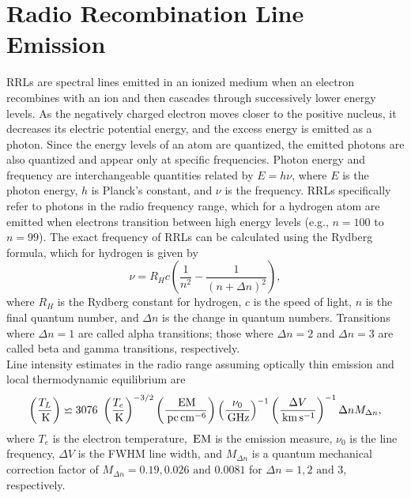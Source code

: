 \section{Radio Recombination Line Emission}
\label{sec:rrl_emission}

RRLs are spectral lines emitted in an ionized medium when an electron recombines with an ion and then cascades through successively lower energy levels. As the negatively charged electron moves closer to the positive nucleus, it decreases its electric potential energy, and the excess energy is emitted as a photon. Since the energy levels of an atom are quantized, the emitted photons are also quantized and appear only at specific frequencies. Photon energy and frequency are interchangeable quantities related by \(E = h\nu\), where \(E\) is the photon energy, \(h\) is Planck's constant, and \(\nu\) is the frequency. RRLs specifically refer to photons in the radio frequency range, which for a hydrogen atom are emitted when electrons transition between high energy levels (e.g., \(n=100\) to \(n=99\)). The exact frequency of RRLs can be calculated using the Rydberg formula, which for hydrogen is given by
\begin{equation}
    \nu = R_H c \left( \frac{1}{n^2} - \frac{1}{(n + \Delta n)^2} \right),
    \label{eq:rydberg_formula}
\end{equation}
where \(R_H\) is the Rydberg constant for hydrogen, \(c\) is the speed of light, \(n\) is the final quantum number, and \(\Delta n\) is the change in quantum numbers. Transitions where \(\Delta n = 1\) are called alpha transitions; those where \(\Delta n = 2\) and \(\Delta n = 3\) are called beta and gamma transitions, respectively.\\

Line intensity estimates in the radio range assuming optically thin emission and local thermodynamic equilibrium are \cite{andersonGBTDiffuseIonized2021}
\begin{equation}
    \left( \frac{T_L}{\, \mathrm{K}} \right) \backsimeq 3076~\left(\frac{T_e}{\, \mathrm{K}}\right)^{-3/2}\left(\frac{\, \mathrm{EM}}{\, \mathrm{pc} \, \mathrm{cm}^{-6}}\right) \left(\frac{\nu_0}{\, \mathrm{GHz}}\right)^{-1} \left(\frac{\Delta V}{\, \mathrm{km} \, \mathrm{s}^{-1}} \right)^{-1} \Delta n M_{\Delta n},
    \label{eq:line_intensity}
\end{equation}
where \(T_e\) is the electron temperature, \(\, \mathrm{EM}\) is the emission measure, \(\nu_0\) is the line frequency, \(\Delta V\) is the FWHM line width, and \(M_{\Delta n}\) is a quantum mechanical correction factor of \(M_{\Delta n} = 0.19, 0.026 \text{ and } 0.0081\) for \(\Delta n = 1, 2 \text{ and } 3\), respectively.\\

